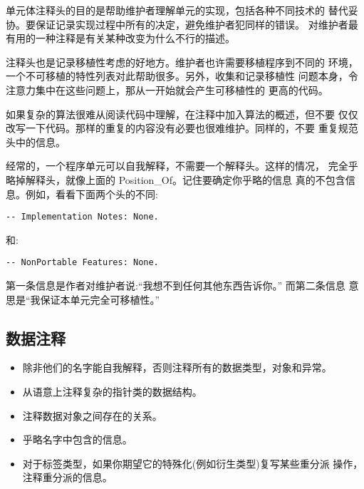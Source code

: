 \begin{blockindent}
单元体注释头的目的是帮助维护者理解单元的实现，包括各种不同技术的
替代妥协。要保证记录实现过程中所有的决定，避免维护者犯同样的错误。
对维护者最有用的一种注释是有关某种改变为什么不行的描述。

注释头也是记录移植性考虑的好地方。维护者也许需要移植程序到不同的
环境，一个不可移植的特性列表对此帮助很多。另外，收集和记录移植性
问题本身，令注意力集中在这些问题上，那从一开始就会产生可移植性的
更高的代码。

如果复杂的算法很难从阅读代码中理解，在注释中加入算法的概述，但不要
仅仅改写一下代码。那样的重复的内容没有必要也很难维护。同样的，不要
重复规范头中的信息。
\end{blockindent}

\begin{blockindent}
经常的，一个程序单元可以自我解释，不需要一个解释头。这样的情况，
完全乎略掉解释头，就像上面的 Position\_Of。记住要确定你乎略的信息
真的不包含信息。例如，看看下面两个头的不同:
\begin{lstlisting}
-- Implementation Notes: None.
\end{lstlisting}
和:
\begin{lstlisting}
-- NonPortable Features: None.
\end{lstlisting}
第一条信息是作者对维护者说:``我想不到任何其他东西告诉你。'' 而第二条信息
意思是``我保证本单元完全可移植性。''
\end{blockindent}

\subsection{数据注释}
\begin{itemize}
    \item 除非他们的名字能自我解释，否则注释所有的数据类型，对象和异常。
    \item 从语意上注释复杂的指针类的数据结构。
    \item 注释数据对象之间存在的关系。
    \item 乎略名字中包含的信息。
    \item 对于标签类型，如果你期望它的特殊化(例如衍生类型)复写某些重分派
    操作，注释重分派的信息。
\end{itemize}

